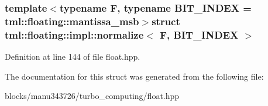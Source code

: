 \subsubsection*{template$<$typename F, typename B\+I\+T\+\_\+\+I\+N\+D\+E\+X = tml\+::floating\+::mantissa\+\_\+msb$>$struct tml\+::floating\+::impl\+::normalize$<$ F, B\+I\+T\+\_\+\+I\+N\+D\+E\+X $>$}



Definition at line 144 of file float.\+hpp.



The documentation for this struct was generated from the following file\+:\begin{DoxyCompactItemize}
\item 
blocks/manu343726/turbo\+\_\+computing/float.\+hpp\end{DoxyCompactItemize}

